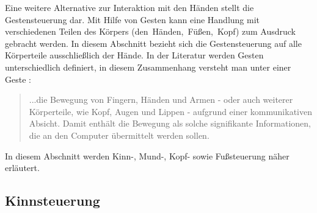 Eine weitere Alternative zur Interaktion mit den Händen stellt die Gestensteuerung dar. Mit Hilfe von Gesten kann eine Handlung mit verschiedenen Teilen des Körpers \mbox{(\zB den Händen, Füßen, Kopf)} zum Ausdruck gebracht werden. In diesem Abschnitt bezieht sich die Gestensteuerung auf alle Körperteile ausschließlich der Hände. In der Literatur werden Gesten unterschiedlich definiert, in diesem Zusammenhang versteht man unter einer Geste \cite{PreimDachselt}:
\begin{quote} ...die Bewegung von Fingern, Händen und Armen - oder auch weiterer Körperteile, wie Kopf, Augen und Lippen - aufgrund einer kommunikativen Absicht. Damit enthält die Bewegung als solche signifikante Informationen, die an den Computer übermittelt werden sollen. \end{quote}
In diesem Abschnitt werden Kinn-, Mund-, Kopf- sowie Fußsteuerung näher erläutert. 
%
%
\subsection{Kinnsteuerung}
\label{cha:Kinnsteuerung}

